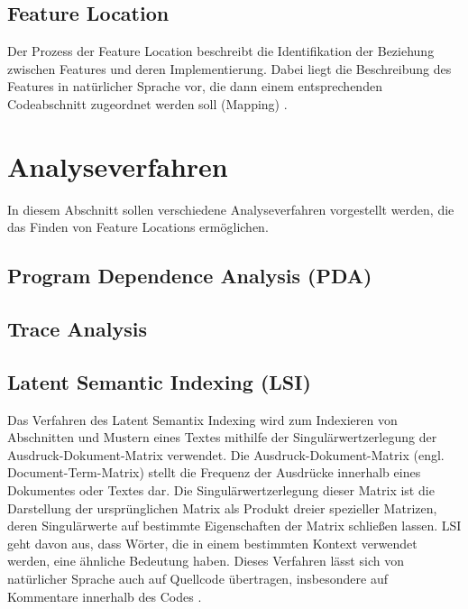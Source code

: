 \documentclass[runningheads,a4paper]{llncs}
\begin{document}
\subsection*{Feature Location}
Der Prozess der Feature Location beschreibt die Identifikation der Beziehung zwischen Features und deren Implementierung. Dabei liegt die Beschreibung des Features in natürlicher Sprache vor, die dann einem entsprechenden Codeabschnitt zugeordnet werden soll (Mapping) \cite{survey}.

\section{Analyseverfahren}

In diesem Abschnitt sollen verschiedene Analyseverfahren vorgestellt werden, die das Finden von Feature Locations ermöglichen.


\subsection*{Program Dependence Analysis (PDA)}

\subsection*{Trace Analysis}

\subsection*{Latent Semantic Indexing (LSI)}

Das Verfahren des Latent Semantix Indexing wird zum Indexieren von Abschnitten und Mustern eines Textes mithilfe der Singulärwertzerlegung der Ausdruck-Dokument-Matrix verwendet. Die Ausdruck-Dokument-Matrix (engl. Document-Term-Matrix) stellt die Frequenz der Ausdrücke innerhalb eines Dokumentes oder Textes dar. Die Singulärwertzerlegung dieser Matrix ist die Darstellung der ursprünglichen Matrix als Produkt dreier spezieller Matrizen, deren Singulärwerte auf bestimmte Eigenschaften der Matrix schließen lassen. LSI geht davon aus, dass Wörter, die in einem bestimmten Kontext verwendet werden, eine ähnliche Bedeutung haben. Dieses Verfahren lässt sich von natürlicher Sprache auch auf Quellcode übertragen, insbesondere auf Kommentare innerhalb des Codes \cite{LSI}.
\end{document}
